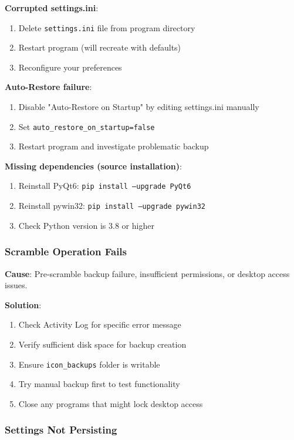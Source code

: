 \documentclass[a4paper,11pt]{article}
\begin{document}
\textbf{Corrupted settings.ini}:
\begin{enumerate}
  \item Delete \texttt{settings.ini} file from program directory
  \item Restart program (will recreate with defaults)
  \item Reconfigure your preferences
\end{enumerate}

\textbf{Auto-Restore failure}:
\begin{enumerate}
  \item Disable "Auto-Restore on Startup" by editing settings.ini manually
  \item Set \texttt{auto\_restore\_on\_startup=false}
  \item Restart program and investigate problematic backup
\end{enumerate}

\textbf{Missing dependencies (source installation)}:
\begin{enumerate}
  \item Reinstall PyQt6: \texttt{pip install --upgrade PyQt6}
  \item Reinstall pywin32: \texttt{pip install --upgrade pywin32}
  \item Check Python version is 3.8 or higher
\end{enumerate}

\subsubsection{Scramble Operation Fails}

\textbf{Cause}: Pre-scramble backup failure, insufficient
permissions, or desktop access issues.

\textbf{Solution}:
\begin{enumerate}
  \item Check Activity Log for specific error message
  \item Verify sufficient disk space for backup creation
  \item Ensure \texttt{icon\_backups} folder is writable
  \item Try manual backup first to test functionality
  \item Close any programs that might lock desktop access
\end{enumerate}

\subsubsection{Settings Not Persisting}
\end{document}
